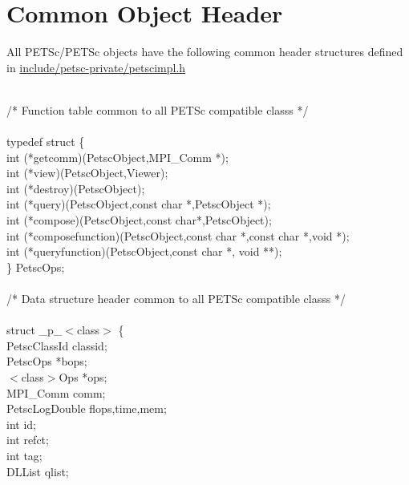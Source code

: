 \documentclass[twoside,12pt]{../sty/report_petsc}
\begin{document}
\section{Common Object Header}

All PETSc/PETSc objects have the following common header structures
defined in \href{http://www.mcs.anl.gov/petsc/petsc-dev/include/petsc-private/petscimpl.h.html}{include/petsc-private/petscimpl.h}

\begin{tabbing}
\\
/* Function table common to all PETSc compatible classs */\\
\\
typedef struct \{ \\
   int (*getcomm)(PetscObject,MPI\_Comm *);\\
   int (*view)(PetscObject,Viewer);\\
   int (*destroy)(PetscObject);\\
   int (*query)(PetscObject,const char *,PetscObject *);\\
   int (*compose)(PetscObject,const char*,PetscObject);\\
   int (*composefunction)(PetscObject,const char *,const char *,void *);\\
   int (*queryfunction)(PetscObject,const char *, void **);\\
\} PetscOps;\\
\\
/* Data structure header common to all PETSc compatible classs */\\
\\
struct \_p\_$<$class$>$ \{\\
  PetscClassId     classid;                                  \\
  PetscOps         *bops;                                   \\
  $<$class$>$Ops   *ops;                                    \\
  MPI\_Comm         comm;                                    \\
  PetscLogDouble  flops,time,mem;                          \\
  int              id;                                      \\
  int              refct;                                   \\
  int              tag;                                     \\
  DLList           qlist;                                   \\

\end{tabbing}
\end{document}
